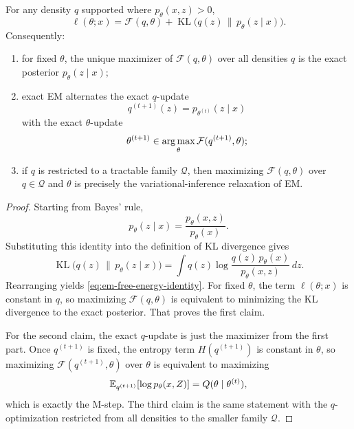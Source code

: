 \begin{proposition}
\label{prop:em-free-energy-coordinate-ascent}
For any density $q$ supported where $p_\theta(x,z)>0$,
\begin{equation}
  \ell(\theta;x)
  =
  \mathcal{F}(q,\theta)
  +
  \operatorname{KL}\!\bigl(q(z)\,\|\,p_\theta(z\mid x)\bigr).
  \label{eq:em-free-energy-identity}
\end{equation}
Consequently:
\begin{enumerate}[leftmargin=*]
  \item for fixed $\theta$, the unique maximizer of $\mathcal{F}(q,\theta)$ over all densities $q$ is the exact posterior $p_\theta(z\mid x)$;
  \item exact EM alternates the exact $q$-update
  \[
    q^{(t+1)}(z)=p_{\theta^{(t)}}(z\mid x)
  \]
  with the exact $\theta$-update
  \[
    \theta^{(t+1)}\in\operatorname*{arg\,max}_\theta \mathcal{F}(q^{(t+1)},\theta);
  \]
  \item if $q$ is restricted to a tractable family $\mathcal{Q}$, then maximizing $\mathcal{F}(q,\theta)$ over $q\in\mathcal{Q}$ and $\theta$ is precisely the variational-inference relaxation of EM.
\end{enumerate}
\end{proposition}
\begin{proof}
Starting from Bayes' rule,
\[
  p_\theta(z\mid x)=\frac{p_\theta(x,z)}{p_\theta(x)}.
\]
Substituting this identity into the definition of KL divergence gives
\[
  \operatorname{KL}\!\bigl(q(z)\,\|\,p_\theta(z\mid x)\bigr)
  =
  \int q(z)\log \frac{q(z)\,p_\theta(x)}{p_\theta(x,z)}\,dz.
\]
Rearranging yields \eqref{eq:em-free-energy-identity}.
For fixed $\theta$, the term \(\ell(\theta;x)\) is constant in \(q\), so maximizing \(\mathcal{F}(q,\theta)\) is equivalent to minimizing the KL divergence to the exact posterior.
That proves the first claim.

For the second claim, the exact $q$-update is just the maximizer from the first part.
Once $q^{(t+1)}$ is fixed, the entropy term $H(q^{(t+1)})$ is constant in $\theta$, so maximizing $\mathcal{F}(q^{(t+1)},\theta)$ over $\theta$ is equivalent to maximizing
\[
  \mathbb{E}_{q^{(t+1)}}[\log p_\theta(x,Z)]
  =
  Q(\theta\mid \theta^{(t)}),
\]
which is exactly the M-step.
The third claim is the same statement with the $q$-optimization restricted from all densities to the smaller family $\mathcal{Q}$.
\end{proof}

